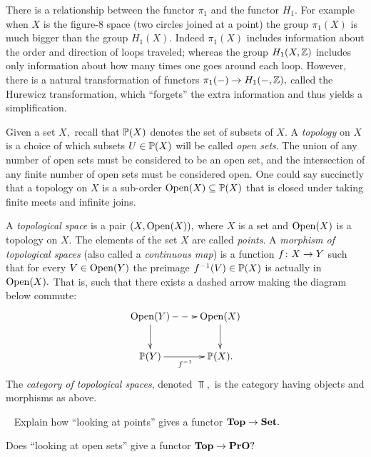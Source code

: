 \documentclass[../main/CT4S-EN-RU]{subfiles}
\begin{document}
\begin{blockENG}
There is a relationship between the functor $\pi_1$ and the functor $H_1.$ For example when $X$ is the figure-$8$ space (two circles joined at a point) the group $\pi_1(X)$ is much bigger than the group $H_1(X).$ Indeed $\pi_1(X)$ includes information about the order and direction of loops traveled; whereas the group $H_1(X,{\mathbb Z})$ includes only information about how many times one goes around each loop. However, there is a natural transformation of functors $\pi_1(-)\rightarrow H_1(-,{\mathbb Z}),$ called the Hurewicz transformation, which “forgets” the extra information and thus yields a simplification. 
\end{blockENG}

\begin{blockRUS}
\end{blockRUS}

\begin{exampleENG}\label{ex:topological space}
Given a set $X,$ recall that ${\mathbb P}(X)$ denotes the set of subsets of $X.$ A {\em topology} on $X$ is a choice of which subsets $U\in{\mathbb P}(X)$ will be called {\em open sets}. The union of any number of open sets must be considered to be an open set, and the intersection of any finite number of open sets must be considered open. One could say succinctly that a topology on $X$ is a sub-order $\operatorname{Open}(X)\subseteq{\mathbb P}(X)$ that is closed under taking finite meets and infinite joins.

A {\em topological space} is a pair $(X,\operatorname{Open}(X)),$ where $X$ is a set and $\operatorname{Open}(X)$ is a topology on $X.$ The elements of the set $X$ are called {\em points}. A {\em morphism of topological spaces} (also called a {\em continuous map}) is a function $f\colon X\rightarrow Y$ such that for every $V\in\operatorname{Open}(Y)$ the preimage $f^\m1(V)\in\PP(X)$ is actually in $\operatorname{Open}(X).$ That is, such that there exists a dashed arrow making the diagram below commute:
$$\xymatrix{\Op(Y)\ar@{-->}[r]\ar[d]&\Op(X)\ar[d]\\\PP(Y)\ar[r]_{f^\m1}&\PP(X).}$$
The {\em category of topological spaces}, denoted $\Top,$ is the category having objects and morphisms as above.
\end{exampleENG}

\begin{exampleRUS}\label{ex:topological space}
\end{exampleRUS}

\begin{exerciseENG}\label{exc:points and opens in Top}~
\sexc Explain how “looking at points” gives a functor ${\mathbf{Top}}\rightarrow{\mathbf{Set}}.$
\item Does “looking at open sets” give a functor ${\mathbf{Top}}\rightarrow{\mathbf{PrO}}?$
\endsexc
\end{exerciseENG}
\end{document}
